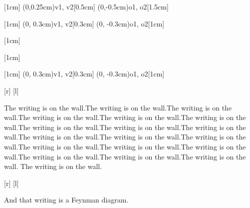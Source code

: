 \documentclass{article}
\begin{document}
\begin{tfeyn}[1cm][1cm]
  [1cm]
  \tfcol(0,0.25cm){v1, v2}[0.5cm]
  \tfcol(0,-0.5cm){o1, o2}[1.5cm]


\end{tfeyn}

\begin{tfeyn}[]
  \def\colsep{1cm}
  \let\lastvertex\undefined
  [1cm]
  \tfcol(0, 0.3cm){v1, v2}[0.3cm]
  \tfcol(0, -0.3cm){o1, o2}[1cm]


\end{tfeyn}

\begin{tfeyn}[]
  \def\colsep{1cm}
  \let\lastvertex\undefined
  [1cm]


\end{tfeyn}

\begin{tfeyn}[]
  \let\lastvertex\undefined
  [1cm]


\end{tfeyn}

\begin{tfeyn}[1cm]
  \let\lastvertex\undefined
  [1cm]
  \tfcol(0, 0.3cm){v1, v2}[0.3cm]
  \tfcol(0, -0.3cm){o1, o2}[1cm]



\end{tfeyn}

\begin{tfeyn}
  [r]
  [l]
\end{tfeyn}

 The writing is on the wall.The writing is on the wall.The writing is on the wall.The writing is on the wall.The writing is on the wall.The writing is on the wall.The writing is on the wall.The writing is on the wall.The writing is on the wall.The writing is on the wall.The writing is on the wall.The writing is on the wall.The writing is on the wall.The writing is on the wall.The writing is on the wall.The writing is on the wall.The writing is on the wall.The writing is on the wall.
The writing is on the wall.
\begin{tfeynin}
  [r]
  [l]
\end{tfeynin}
And that writing is a Feynman diagram.
\end{document}
